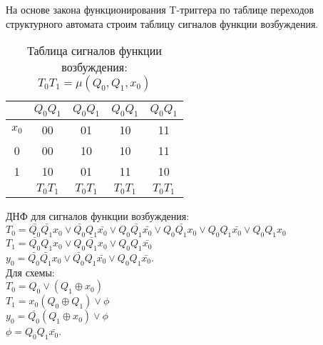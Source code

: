 \documentclass[a4paper,10pt]{article}
\begin{document}
			На основе закона функционирования T-триггера по таблице переходов структурного автомата
			строим таблицу сигналов функции возбуждения. \\

    		\begin{table}[h!]
				\center
        		\begin{tabular}{|c|c|c|c|c|}
        			\hline
							  &$Q_0Q_1$  &$Q_0Q_1$  &$Q_0Q_1$  &$Q_0Q_1$  \\ \hline
            		 $x_0$    & 00       & 01       & 10       & 11 \\ \hline
            			 0	  & 00       & 10       & 10       & 11 \\ \hline 
            			 1    & 10       & 01       & 11       & 10 \\ \hline
							  & $T_0T_1$ & $T_0T_1$ & $T_0T_1$ & $T_0T_1$ \\ \hline
        		\end{tabular}
    			\caption{Таблица сигналов функции возбуждения: $T_0T_1 = \mu(Q_0,Q_1,x_0)$}
    		\end{table}

			ДНФ для сигналов функции возбуждения: \\
			$T_0 = \bar{Q_0} \bar{Q_1} x_0 \lor \bar{Q_0} Q_1 \bar{x_0} \lor Q_0 \bar{Q_1} \bar{x_0} \lor Q_0 \bar{Q_1} x_0 \lor Q_0 Q_1 \bar{x_0} \lor Q_0 Q_1 x_0 $ \\
			$T_1 = \bar{Q_0} Q_1 x_0 \lor Q_0 \bar{Q_1} x_0 \lor Q_0 Q_1 \bar{x_0}$ \\
        	$y_0 = \bar{Q_0} \bar{Q_1} x_0 \lor \bar{Q_0} Q_1 \bar{x_0} \lor Q_0 Q_1 \bar{x_0}$. \\

	 		Для схемы: \\
			$T_0 = Q_0 \lor (Q_1 \oplus x_0)$ \\
			$T_1 = x_0 (Q_0 \oplus Q_1) \lor \phi$ \\
			$y_0 = \bar{Q_0} (Q_1 \oplus x_0) \lor \phi$ \\
			$\phi = Q_0 Q_1 \bar{x_0}$.
\end{document}
